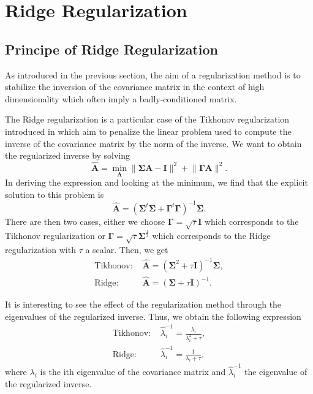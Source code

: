 \documentclass[a4paper,11pt,DIV=16]{scrartcl}
\begin{document}
\section{Ridge Regularization}
\label{sec:regularization}

    \subsection{Principe of Ridge Regularization}
    As introduced in the previous section, the aim of a regularization method is to stabilize the inversion of the covariance matrix in the context of high dimensionality which often imply a badly-conditioned matrix.

    The Ridge regularization is a particular case of the Tikhonov regularization introduced in \cite{hoerl1970ridge} which aim to penalize the linear problem used to compute the inverse of the covariance matrix by the norm of the inverse. We want to obtain the regularized inverse by solving
    \begin{equation}
        \hat{\mathbf{A}} = \min_\mathbf{A} \lVert\boldsymbol{\Sigma} \mathbf{A} - \mathbf{I}\rVert^2 + \lVert\boldsymbol{\Gamma}\mathbf{A}\rVert^2.
    \end{equation}
    In deriving the expression and looking at the minimum, we find that the explicit solution to this problem is
    \begin{equation}
        \hat{\mathbf{A}} = (\boldsymbol{\Sigma}^t\boldsymbol{\Sigma} + \boldsymbol{\Gamma}^t \boldsymbol{\Gamma})^{-1} \boldsymbol{\Sigma}.
    \end{equation}
    There are then two cases, either we choose $\boldsymbol{\Gamma} = \sqrt{\tau} \mathbf{I}$ which corresponds to the Tikhonov regularization or $\boldsymbol{\Gamma} = \sqrt{\tau} \boldsymbol{\Sigma}^{\frac{1}{2}}$ which corresponds to the Ridge regularization with $\tau$ a scalar. Then, we get
    \begin{align}
        \text{Tikhonov: }& \hat{\mathbf{A}} = (\boldsymbol{\Sigma}^2 + \tau \mathbf{I})^{-1} \boldsymbol{\Sigma},\\
        \text{Ridge: }& \hat{\mathbf{A}} = (\boldsymbol{\Sigma} + \tau \mathbf{I})^{-1}.
    \end{align}

    It is interesting to see the effect of the regularization method through the eigenvalues of the regularized inverse. Thus, we obtain the following expression
    \begin{align}
        \text{Tikhonov: }& \hat{\lambda}_i^{-1} = \frac{\lambda_i}{\lambda_i^2 + \tau},\\
        \text{Ridge: }& \hat{\lambda}_i^{-1} = \frac{1}{\lambda_i + \tau},
    \end{align}
    where $\lambda_i$ is the ith eigenvalue of the covariance matrix and $\hat{\lambda}_i^{-1}$ the eigenvalue of the regularized inverse.
\end{document}

